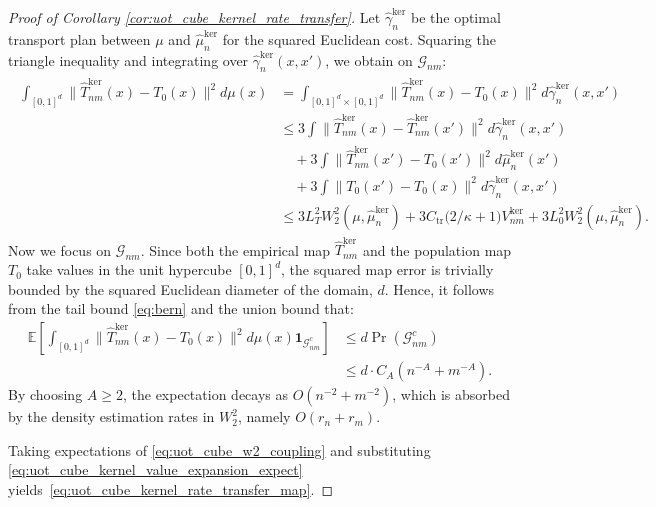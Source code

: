 \documentclass[11pt,reqno]{amsart}
\theoremstyle{definition}
\renewcommand{\hat}{\widehat}
\newcommand{\Ep}{\mathbb{E}}
\begin{document}
\begin{proof}[Proof of Corollary \ref{cor:uot_cube_kernel_rate_transfer}]
Let $\hat\gamma_n^{\mathrm{ker}}$ be the optimal transport plan between $\mu$ and $\hat\mu_n^{\mathrm{ker}}$ for the squared Euclidean cost. Squaring the triangle inequality and integrating over $\hat\gamma_n^{\mathrm{ker}}(x,x')$, we obtain on $\mathcal{G}_{nm}$:
\begin{align}
\label{eq:uot_cube_w2_coupling}
\begin{aligned}
    \int_{[0,1]^d} \|\hat T_{nm}^{\mathrm{ker}}(x)-T_0(x)\|^2 d\mu(x) 
    &= \int_{[0,1]^d \times [0,1]^d} \|\hat T_{nm}^{\mathrm{ker}}(x)-T_0(x)\|^2 d\hat\gamma_n^{\mathrm{ker}}(x,x') \\
    &\le 3 \int \|\hat T_{nm}^{\mathrm{ker}}(x) - \hat T_{nm}^{\mathrm{ker}}(x')\|^2 d\hat\gamma_n^{\mathrm{ker}}(x,x') \\
    &\quad + 3 \int \|\hat T_{nm}^{\mathrm{ker}}(x') - T_0(x')\|^2 d\hat\mu_n^{\mathrm{ker}}(x') \\
    &\quad + 3 \int \|T_0(x') - T_0(x)\|^2 d\hat\gamma_n^{\mathrm{ker}}(x,x') \\
    &\le 3 L_T^2 W_2^2(\mu, \hat\mu_n^{\mathrm{ker}}) 
    + 3 C_{\mathrm{tr}} \bigl( 2/\kappa + 1 \bigr) V_{nm}^{\mathrm{ker}} 
    + 3 L_0^2 W_2^2(\mu, \hat\mu_n^{\mathrm{ker}}).
\end{aligned}
\end{align}
Now we focus on $\mathcal{G}_{nm}$. Since both the empirical map $\hat T_{nm}^{\mathrm{ker}}$ and the population map $T_0$ take values in the unit hypercube $[0,1]^d$, the squared map error is trivially bounded by the squared Euclidean diameter of the domain, $d$. Hence, it follows from the tail bound \eqref{eq:bern} and the union bound that:
\begin{align}
    \Ep\left[ \int_{[0,1]^d} \|\hat T_{nm}^{\mathrm{ker}}(x)-T_0(x)\|^2 d\mu(x) \mathbf{1}_{\mathcal{G}_{nm}^c} \right] &\le d\Pr(\mathcal{G}^c_{nm}) \\ 
    &\le d \cdot C_A(n^{-A} + m^{-A}).
\end{align}
By choosing $A \ge 2$, the expectation decays as $O(n^{-2} + m^{-2})$, which is absorbed by the density estimation rates in $W^2_2$, namely $O(r_n + r_m)$. 

Taking expectations of \eqref{eq:uot_cube_w2_coupling} and substituting \eqref{eq:uot_cube_kernel_value_expansion_expect} yields~\eqref{eq:uot_cube_kernel_rate_transfer_map}.


\end{proof}
\end{document}
